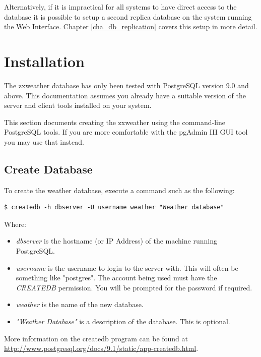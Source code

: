 \documentclass[a4paper,10pt,draft]{book}
\begin{document}
Alternatively, if it is impractical for all systems to have direct access to the database it is possible to setup a second replica database on the system running the Web Interface. Chapter \ref{cha_db_replication} covers this setup in more detail.

\section{Installation}


The zxweather database has only been tested with PostgreSQL version 9.0 and above. This documentation assumes you already have a suitable version of the server and client tools installed on your system.

This section documents creating the zxweather using the command-line PostgreSQL tools. If you are more comfortable with the pgAdmin III GUI tool you may use that instead.

\subsection{Create Database}
To create the weather database, execute a command such as the following:

\begin{verbatim}
$ createdb -h dbserver -U username weather "Weather database"
\end{verbatim}

Where:
\begin{itemize}
\item \emph{dbserver} is the hostname (or IP Address) of the machine running PostgreSQL.
\item \emph{username} is the username to login to the server with. This will often be something like "postgres". The account being used must have the \emph{CREATEDB} permission. You will be prompted for the password if required.
\item \emph{weather} is the name of the new database.
\item \emph{"Weather Database"} is a description of the database. This is optional.
\end{itemize}

More information on the createdb program can be found at \url{http://www.postgresql.org/docs/9.1/static/app-createdb.html}.
\end{document}
